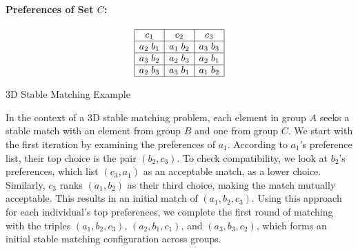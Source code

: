 \paragraph{Preferences of Set \( C \):}
\[
\begin{array}{|c|c|c|}
\hline
c_1 & c_2 & c_3 \\ \hline
a_2 \; b_1 & a_1 \; b_2 & a_3 \; b_3 \\ \hline
a_3 \; b_2 & a_2 \; b_3 & a_2 \; b_1 \\ \hline
a_2 \; b_3 & a_3 \; b_1 & a_1 \; b_2 \\ \hline
\end{array}
\]

\begin{center}
\end{center}


\begin{center}
    3D Stable Matching Example
\end{center}

In the context of a 3D stable matching problem, each element in group \( A \) seeks a stable match with an element from group \( B \) and one from group \( C \). We start with the first iteration by examining the preferences of \( a_1 \). According to \( a_1 \)’s preference list, their top choice is the pair \( (b_2, c_3) \). To check compatibility, we look at \( b_2 \)'s preferences, which list \( (c_3, a_1) \) as an acceptable match, as a lower choice. Similarly, \( c_3 \) ranks \( (a_1, b_2) \) as their third choice, making the match mutually acceptable. This results in an initial match of \( (a_1, b_2, c_3) \). Using this approach for each individual’s top preferences, we complete the first round of matching with the triples \( (a_1, b_2, c_3) \), \( (a_2, b_1, c_1) \), and \( (a_3, b_3, c_2) \), which forms an initial stable matching configuration across groups.

